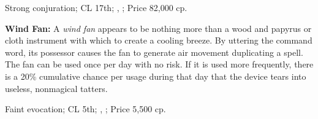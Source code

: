 Strong conjuration; CL 17th; , ; Price 82,000 cp.



\textbf{Wind Fan:} A \emph{wind fan} appears to be nothing more than a wood and papyrus or cloth instrument with which to create a cooling breeze. By uttering the command word, its possessor causes the fan to generate air movement duplicating a  spell. The fan can be used once per day with no risk. If it is used more frequently, there is a 20\% cumulative chance per usage during that day that the device tears into useless, nonmagical tatters.

Faint evocation; CL 5th; , ; Price 5,500 cp.
